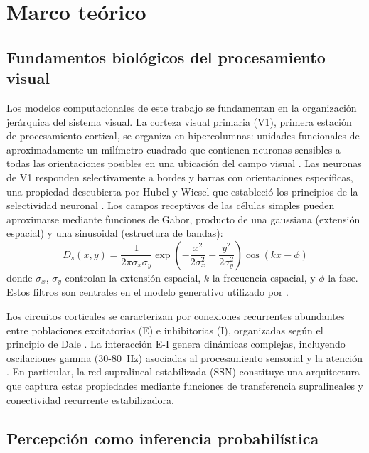 \documentclass[spanish,a4paper,11pt]{article}
\begin{document}
\section{Marco teórico}
\label{sec:marco}

\subsection{Fundamentos biológicos del procesamiento visual}

Los modelos computacionales de este trabajo se fundamentan en la organización jerárquica del sistema visual. La corteza visual primaria (V1), primera estación de procesamiento cortical, se organiza en hipercolumnas: unidades funcionales de aproximadamente un milímetro cuadrado que contienen neuronas sensibles a todas las orientaciones posibles en una ubicación del campo visual \citep{hubel1959receptive}. Las neuronas de V1 responden selectivamente a bordes y barras con orientaciones específicas, una propiedad descubierta por Hubel y Wiesel que estableció los principios de la selectividad neuronal \citep{dayan2005theoretical}. Los campos receptivos de las células simples pueden aproximarse mediante funciones de Gabor, producto de una gaussiana (extensión espacial) y una sinusoidal (estructura de bandas):
\begin{equation}
D_s(x, y) = \frac{1}{2\pi\sigma_x\sigma_y} \exp\left(-\frac{x^2}{2\sigma_x^2} - \frac{y^2}{2\sigma_y^2}\right) \cos(kx - \phi)
\label{eq:gabor}
\end{equation}
donde $\sigma_x$, $\sigma_y$ controlan la extensión espacial, $k$ la frecuencia espacial, y $\phi$ la fase. Estos filtros son centrales en el modelo generativo utilizado por \citet{echeveste2020cortical}.

Los circuitos corticales se caracterizan por conexiones recurrentes abundantes entre poblaciones excitatorias (E) e inhibitorias (I), organizadas según el principio de Dale \citep{dale1935pharmacology}. La interacción E-I genera dinámicas complejas, incluyendo oscilaciones gamma (30-80~Hz) asociadas al procesamiento sensorial y la atención \citep{echeveste2020cortical}. En particular, la red supralineal estabilizada (SSN) constituye una arquitectura que captura estas propiedades mediante funciones de transferencia supralineales y conectividad recurrente estabilizadora.

\subsection{Percepción como inferencia probabilística}
\end{document}
